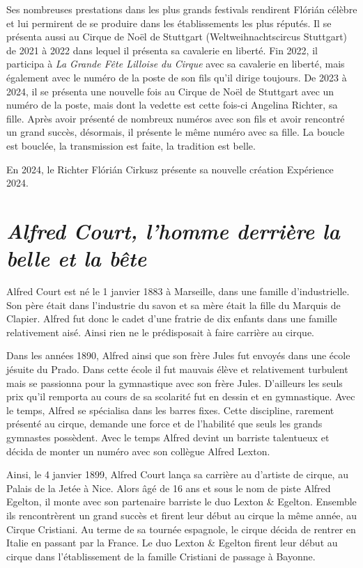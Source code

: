 Ses nombreuses prestations dans les plus grands festivals rendirent Flórián célèbre et lui permirent de se produire dans les établissements les plus réputés. Il se présenta aussi au Cirque de Noël de Stuttgart (Weltweihnachtscircus Stuttgart) de 2021 à 2022 dans lequel il présenta sa cavalerie en liberté. Fin 2022, il participa à \textit{La Grande Fête Lilloise du Cirque} avec sa cavalerie en liberté, mais également avec le numéro de la poste de son fils qu’il dirige toujours. De 2023 à 2024, il se présenta une nouvelle fois au Cirque de Noël de Stuttgart avec un numéro de la poste, mais dont la vedette est cette fois-ci Angelina Richter, sa fille. Après avoir présenté de nombreux numéros avec son fils et avoir rencontré un grand succès, désormais, il présente le même numéro avec sa fille. La boucle est bouclée, la transmission est faite, la tradition est belle.

En 2024, le Richter Flórián Cirkusz présente sa nouvelle création Expérience 2024. 

\section*{\textit{Alfred Court, l’homme derrière la belle et la bête}}
{}

Alfred Court est né le 1 janvier 1883 à Marseille, dans une famille d’industrielle. Son père était dans l’industrie du savon et sa mère était la fille du Marquis de Clapier. Alfred fut donc le cadet d’une fratrie de dix enfants dans une famille relativement aisé. Ainsi rien ne le prédisposait à faire carrière au cirque.

Dans les années 1890, Alfred ainsi que son frère Jules fut envoyés dans une école jésuite du Prado. Dans cette école il fut mauvais élève et relativement turbulent mais se passionna pour la gymnastique avec son frère Jules. D’ailleurs les seuls prix qu’il remporta au cours de sa scolarité fut en dessin et en gymnastique. Avec le temps, Alfred se spécialisa dans les barres fixes. Cette discipline, rarement présenté au cirque, demande une force et de l’habilité que seuls les grands gymnastes possèdent. Avec le temps Alfred devint un barriste talentueux et décida de monter un numéro avec son collègue Alfred Lexton.

Ainsi, le 4 janvier 1899, Alfred Court lança sa carrière au d’artiste de cirque, au Palais de la Jetée à Nice. Alors âgé de 16 ans et sous le nom de piste Alfred Egelton, il monte avec son partenaire barriste le duo Lexton \& Egelton. Ensemble ils rencontrèrent un grand succès et firent leur début au cirque la même année, au Cirque Cristiani. Au terme de sa tournée espagnole, le cirque décida de rentrer en Italie en passant par la France. Le duo Lexton \& Egelton firent leur début au cirque dans l’établissement de la famille Cristiani de passage à Bayonne.

